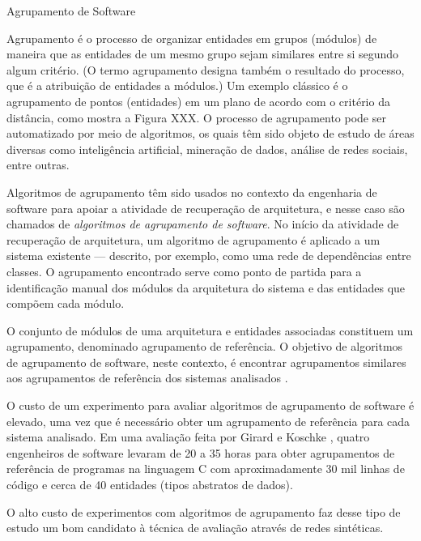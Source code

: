 \begin{section}{Agrupamento de Software}
	
Agrupamento é o processo de organizar entidades em grupos (módulos) de maneira que as entidades de um mesmo grupo sejam similares entre si segundo algum critério. (O termo agrupamento designa também o resultado do processo, que é a atribuição de entidades a módulos.) Um exemplo clássico é o agrupamento de pontos (entidades) em um plano de acordo com o critério da distância, como mostra a Figura XXX. O processo de agrupamento pode ser automatizado por meio de algoritmos, os quais têm sido objeto de estudo de áreas diversas como inteligência artificial, mineração de dados, análise de redes sociais, entre outras.


Algoritmos de agrupamento têm sido usados no contexto da engenharia de software para apoiar a atividade de recuperação de arquitetura, e nesse caso são chamados de \emph{algoritmos de agrupamento de software}. No início da atividade de recuperação de arquitetura, um algoritmo de agrupamento é aplicado a um sistema existente --- descrito, por exemplo, como uma rede de dependências entre classes. O agrupamento encontrado serve como ponto de partida para a identificação manual dos módulos da arquitetura do sistema e das entidades que compõem cada módulo. 

O conjunto de módulos de uma arquitetura e entidades associadas constituem um agrupamento, denominado agrupamento de referência. O objetivo de algoritmos de agrupamento de software, neste contexto, é encontrar agrupamentos similares aos agrupamentos de referência dos sistemas analisados \cite{Koschke2000}. 

O custo de um experimento para avaliar algoritmos de agrupamento de software é elevado, uma vez que é necessário obter um agrupamento de referência para cada sistema analisado. Em uma avaliação feita por Girard e Koschke \cite{Girard...}, quatro engenheiros de software levaram de 20 a 35 horas para obter agrupamentos de referência de programas na linguagem C com aproximadamente 30 mil linhas de código e cerca de 40 entidades (tipos abstratos de dados).



O alto custo de experimentos com algoritmos de agrupamento faz desse tipo de estudo um bom candidato à técnica de avaliação através de redes sintéticas.


\end{section}
